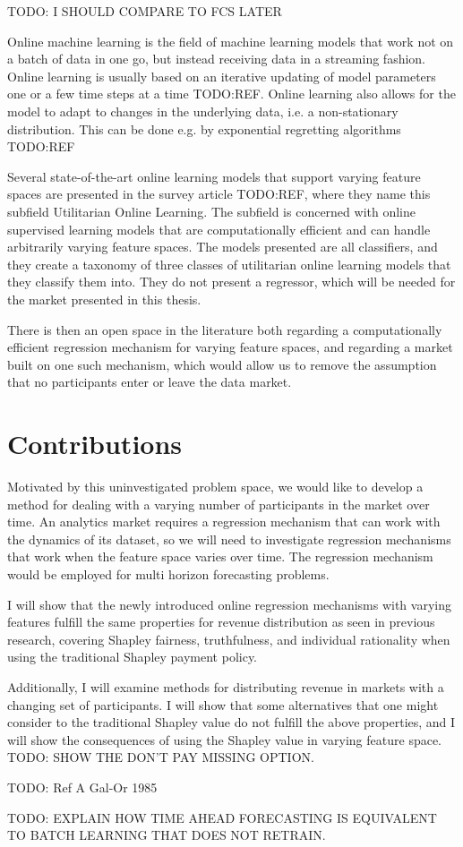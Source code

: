 TODO: I SHOULD COMPARE TO FCS LATER

Online machine learning is the field of machine learning models that work not
on a batch of data in one go, but instead receiving data in a streaming
fashion. Online learning is usually based on an iterative updating of model
parameters one or a few time steps at a time TODO:REF. Online learning also
allows for the model to adapt to changes in the underlying data, i.e. a
non-stationary distribution. This can be done e.g. by exponential regretting
algorithms TODO:REF

Several state-of-the-art online learning models that support varying feature
spaces are presented in the survey article TODO:REF, where they name this
subfield Utilitarian Online Learning. The subfield is concerned with online
supervised learning models that are computationally efficient and can handle
arbitrarily varying feature spaces. The models presented are all classifiers,
and they create a taxonomy of three classes of utilitarian online learning
models that they classify them into. They do not present a regressor, which
will be needed for the market presented in this thesis.

There is then an open space in the literature both regarding a computationally
efficient regression mechanism for varying feature spaces, and regarding a
market built on one such mechanism, which would allow us to remove the
assumption that no participants enter or leave the data market.

\section{Contributions}

Motivated by this uninvestigated problem space, we would like to develop a
method for dealing with a varying number of participants in the market over
time. An analytics market requires a regression mechanism that can work with
the dynamics of its dataset, so we will need to investigate regression
mechanisms that work when the feature space varies over time. The regression
mechanism would be employed for multi horizon forecasting problems.

I will show that the newly introduced online regression mechanisms with
varying features fulfill the same properties for revenue distribution as seen
in previous research, covering Shapley fairness, truthfulness, and individual
rationality when using the traditional Shapley payment policy.

Additionally, I will examine methods for distributing revenue in markets with a
changing set of participants. I will show that some alternatives that one might
consider to the traditional Shapley value do not fulfill the above properties,
and I will show the consequences of using the Shapley value in varying feature
space. TODO: SHOW THE DON'T PAY MISSING OPTION.

TODO: Ref A Gal-Or 1985

TODO: EXPLAIN HOW TIME AHEAD FORECASTING IS EQUIVALENT TO BATCH LEARNING THAT DOES NOT RETRAIN.




